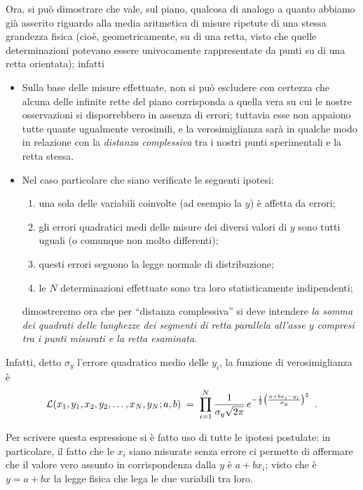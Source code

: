 Ora, si pu\`o dimostrare che vale, sul piano, qualcosa di
analogo a quanto abbiamo gi\`a asserito riguardo alla media
aritmetica di misure ripetute di una stessa grandezza fisica
(cio\`e, geometricamente, su di una retta, visto che quelle
determinazioni potevano essere univocamente rappresentate da
punti su di una retta orientata); infatti
\begin{itemize}
\item Sulla base delle misure effettuate, non si pu\`o
  escludere con certezza che alcuna delle infinite rette del
  piano corrisponda a quella vera su cui le nostre
  osservazioni si disporrebbero in assenza di errori;
  tuttavia esse non appaiono tutte quante ugualmente
  verosimili, e la verosimiglianza sar\`a in qualche modo in
  relazione con la \emph{distanza complessiva} tra i nostri
  punti sperimentali e la retta stessa.
\item Nel caso particolare che siano verificate le seguenti
  ipotesi:
    \begin{enumerate}
    \item una sola delle variabili coinvolte (ad esempio la
      $y$) \`e affetta da errori;
    \item gli errori quadratici medi delle misure dei
      diversi valori di $y$ sono tutti uguali (o comunque
      non molto differenti);
    \item questi errori seguono la legge normale di
      distribuzione;
    \item le $N$ determinazioni effettuate sono tra loro
      statisticamente indipendenti;
    \end{enumerate}
    dimostreremo ora che per ``distanza complessiva'' si
    deve intendere \emph{la somma dei quadrati delle
      lunghezze dei segmenti di retta parallela all'asse $y$
      compresi tra i punti misurati e la retta esaminata}.
\end{itemize}

Infatti, detto $\sigma_y$ l'errore quadratico medio delle
$y_i$, la funzione di verosimiglianza \`e
\begin{equation*}%
\index{funzione!di verosimiglianza|(}
  \mathcal{L} (x_1, y_1, x_2, y_2,\ldots,x_N, y_N ;
    a, b ) \; = \; \prod_{i=1}^N \frac{1}{\sigma_y
    \sqrt{2 \pi}} \,  e^{- \frac{1}{2}
    \left( \frac{a + b x_i - y_i}{\sigma_y} \right)
    ^2 } \peq .
\end{equation*}

Per scrivere questa espressione si \`e fatto uso di tutte le
ipotesi postulate: in particolare, il fatto che le $x_i$
siano misurate senza errore ci permette di affermare che il
valore vero assunto in corrispondenza dalla $y$ \`e $ a + b
x_i$; visto che \`e $y = a + bx$ la legge fisica che lega le
due variabili tra loro.

